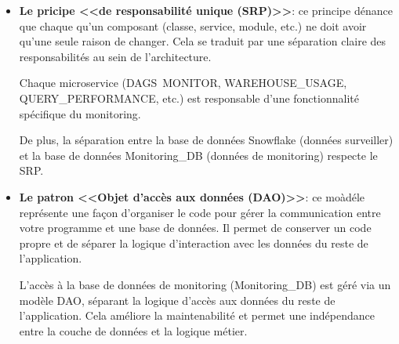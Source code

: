 \begin{itemize}
    \item \textbf{Le pricipe <<de responsabilité unique (SRP)>>}: ce principe dénance que chaque qu'un composant (classe, service, module, etc.) ne doit avoir qu'une seule raison de changer. 
    Cela se traduit par une séparation claire des responsabilités au sein de l'architecture\cite{SRP}.
    \par Chaque microservice (DAGS\ MONITOR, WAREHOUSE\_USAGE, QUERY\_PERFORMANCE, etc.) est responsable d'une fonctionnalité spécifique du monitoring.
   \par De plus, la séparation entre la base de données Snowflake (données  surveiller) et la base de données Monitoring\_DB (données de monitoring) respecte le SRP.
    \item \textbf{Le patron <<Objet d'accès aux données (DAO)>>}: ce moàdéle représente une façon d'organiser le code pour gérer la communication entre votre programme et une base de données.
    Il permet de conserver un code propre et de séparer la logique d'interaction avec les données du reste de l'application\cite{DAO}.
    \par L'accès à la base de données de monitoring (Monitoring\_DB) est géré via un modèle DAO, séparant la logique d'accès aux données du reste de l'application.
    Cela améliore la maintenabilité et permet une indépendance entre la couche de données et la logique métier.
\end{itemize}

